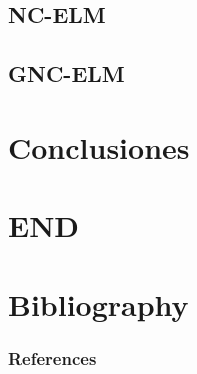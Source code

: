 \documentclass{beamer}
\begin{document}
\subsection{NC-ELM}
\subsection{GNC-ELM}

\section{Conclusiones} %



\section*{END}

\section*{Bibliography}
\begin{frame}[allowframebreaks]
	\frametitle{References}
    
	
\end{frame}
\end{document}

